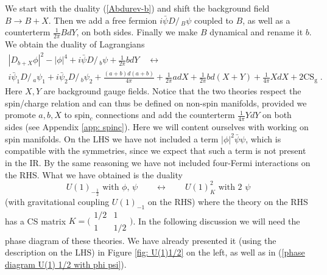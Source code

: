 \documentclass[a4paper, 12pt]{article}
\numberwithin{equation}{section}
\newcommand{\Dslash}{D\!\!\!\!\slash\,}
\newcommand{\smat}[1]{\big( \begin{smallmatrix} #1 \end{smallmatrix} \big)}
\newcommand{\be}{\begin{equation}} \newcommand{\ee}{\end{equation}}
\begin{document}
We start with the duality (\ref{Abdurev-b}) and shift the background field $B \to B + X$. Then we add a free fermion $i\bar\psi \Dslash_B \psi$ coupled to $B$, as well as a counterterm $\frac1{2\pi} BdY$, on both sides. Finally we make $B$ dynamical and rename it $b$. We obtain the duality of Lagrangians
\begin{multline}
\label{Abelian duality 1}
|D_{b+X}\phi|^2 - |\phi|^4 + i \bar\psi \Dslash_b \psi + \frac1{2\pi} bdY \quad\longleftrightarrow \\
i \bar\psi_1 \Dslash_a \psi_1 + i \bar\psi_2 \Dslash_b \psi_2 + \frac{(a+b)d(a+b)}{4\pi} + \frac1{2\pi} adX + \frac1{2\pi} bd(X+Y) + \frac1{4\pi} XdX + 2\text{CS}_\text{g} \;.
\end{multline}
Here $X,Y$ are background gauge fields. Notice that the two theories respect the spin/charge relation \cite{Seiberg:2016rsg, Seiberg:2016gmd} and can thus be defined on non-spin manifolds, provided we promote $a, b, X$ to spin$_c$ connections and add the counterterm $\frac1{4\pi} YdY$ on both sides (see Appendix \ref{app: spinc}). Here we will content ourselves with working on spin manifolds. On the LHS we have not included a term $|\phi|^2 \bar\psi\psi$, which is compatible with the symmetries, since we expect that such a term is not present in the IR. By the same reasoning we have not included four-Fermi interactions on the RHS. What we have obtained is the duality
\be
\label{Abelian duality 1 summary}
U(1)_{-\frac12} \text{ with $\phi$, $\psi$} \qquad\longleftrightarrow\qquad U(1)^2_K \text{ with 2 $\psi$}
\ee
(with gravitational coupling $U(1)_{-1}$ on the RHS) where the theory on the RHS has a CS matrix $K = \smat{1/2 & 1 \\ 1 & 1/2}$. In the following discussion we will need the phase diagram of these theories. We have already presented it (using the description on the LHS) in Figure \ref{fig: U(1)1/2} on the left, as well as in (\ref{phase diagram U(1) 1/2 with phi psi}).
\end{document}
